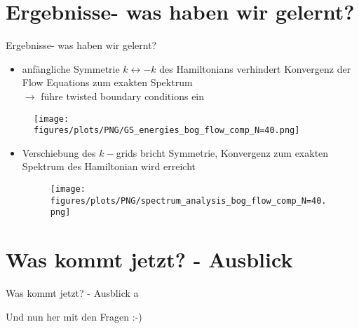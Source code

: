 \documentclass{beamer}
\begin{document}
\section{Ergebnisse- was haben wir gelernt?}
\begin{frame}[allowframebreaks]{Ergebnisse- was haben wir gelernt?}
\begin{itemize}
\item anfängliche Symmetrie $k\leftrightarrow-k$ des Hamiltonians verhindert Konvergenz der Flow Equations zum exakten Spektrum\\
$\rightarrow$ führe twisted boundary conditions ein
\end{itemize}
\begin{figure}[H]
    \centering
    \texttt{[image: figures/plots/PNG/GS\_energies\_bog\_flow\_comp\_N=40.png]}
\end{figure}
\framebreak
\begin{itemize}
\item Verschiebung des $k-$grids bricht Symmetrie, Konvergenz zum exakten Spektrum des Hamiltonian wird erreicht
\begin{figure}[H]
    \centering
    \texttt{[image: figures/plots/PNG/spectrum\_analysis\_bog\_flow\_comp\_N=40.png]}
\end{figure}
\end{itemize}
\end{frame}
\section{Was kommt jetzt? - Ausblick}
\begin{frame}{Was kommt jetzt? - Ausblick}
a
\end{frame}

\begin{frame}
\begin{centering}
Und nun her mit den Fragen :-)
\end{centering}
\end{frame}
\end{document}
